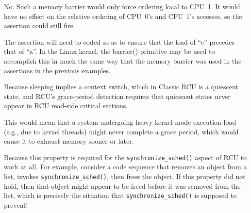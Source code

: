 
No.  Such a memory barrier would only force ordering local to CPU~1.
It would have no effect on the relative ordering of CPU~0's and
CPU~1's accesses, so the assertion could still fire.


The assertion will need to coded so as to ensure that the load of
``e'' precedes that of ``a''.
In the Linux kernel, the barrier() primitive may be used to accomplish
this in much the same way that the memory barrier was used in the
assertions in the previous examples.


Because sleeping implies a context switch, which in Classic RCU is
a quiescent state, and RCU's grace-period detection requires that
quiescent states never appear in RCU read-side critical sections.


This would mean that a system undergoing heavy kernel-mode execution load
(e.g., due to kernel threads) might never complete a grace period, which
would cause it to exhaust memory sooner or later.


	Because this property is required for the {\tt synchronize\_sched()}
	aspect of RCU to work at all.
	For example, consider a code sequence that removes an object
	from a list, invokes {\tt synchronize\_sched()}, then frees
	the object.
	If this property did not hold, then that object might appear
	to be freed before it was
	removed from the list, which is precisely the situation that
	{\tt synchronize\_sched()} is supposed to prevent!


